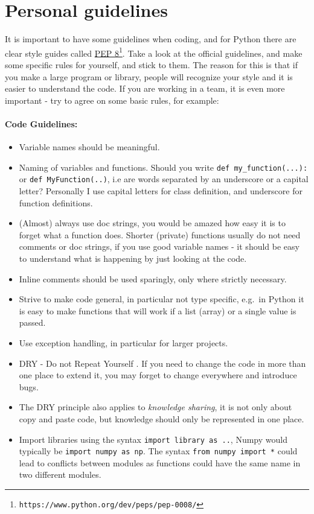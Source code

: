 \documentclass[graybox,sectrefs,envcountresetchap,open=right,final]{svmonodo}
\begin{document}
\section{Personal guidelines}
It is important to have some guidelines when coding, and for Python there are clear style guides called \href{{https://www.python.org/dev/peps/pep-0008/}}{PEP 8}\footnote{\texttt{https://www.python.org/dev/peps/pep-0008/}}. Take a look at the official guidelines, and  make some specific rules for yourself, and stick to them. The reason for this is that if you make a large program or library, people will recognize your style and it is easier to understand the code. If you are working in a team, it is even more important - try to agree on some basic rules, for example:

\paragraph{Code Guidelines:}
\begin{itemize}
\item Variable names should be meaningful.

\item Naming of variables and functions. Should you write \Verb!def my_function(...):! or \texttt{def MyFunction(..)}, i.e are words separated by an underscore or a capital letter? Personally I use capital letters for class definition, and underscore for function definitions.

\item (Almost) always use doc strings, you would be amazed how easy it is to forget what a function does. Shorter (private) functions usually do not need comments or doc strings, if you use good variable names - it should be easy to understand what is happening by just looking at the code.

\item Inline comments should be used sparingly, only where strictly necessary.

\item Strive to make code general, in particular not type specific, e.g.~in Python it is easy to make functions that will work if a list (array) or a single value is passed.

\item Use exception handling, in particular for larger projects.

\item DRY - Do not Repeat Yourself \cite{thomas2019pragmatic}. If you need to change the code in more than one place to extend it, you may forget to change everywhere and introduce bugs.

\item The DRY principle also applies to \emph{knowledge sharing}, it is not only about copy and paste code, but knowledge should only be represented in one place. 

\item Import libraries using the syntax \texttt{import library as ..}, Numpy would typically be \texttt{import numpy as np}. The syntax \texttt{from numpy import *} could lead to conflicts between modules as functions could have the same name in two different modules.
\end{itemize}
\end{document}
